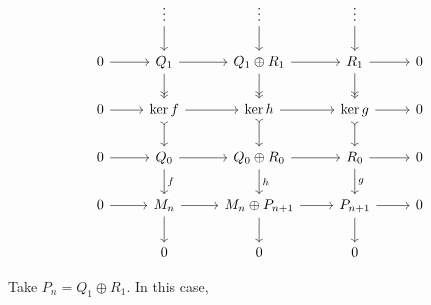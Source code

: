 \[\begin{tikzcd}
  & \vdots \ar{d} & \vdots \ar{d} & \vdots \ar{d} & \\
  0 \ar{r} & Q_1 \ar[->>]{d} \ar{r} & Q_1 \oplus R_1 \ar[->>]{d} \ar{r} & R_1 \ar[->>]{d} \ar{r} & 0 \\
  0 \ar{r} & \ker f \ar[>->]{d} \ar{r} & \ker h \ar[>->]{d} \ar{r} & \ker g \ar[>->]{d} \ar{r} & 0 \\
  0 \ar{r} & Q_0 \ar["f"]{d} \ar{r} & Q_0 \oplus R_0 \ar["h"]{d} \ar{r} & R_0 \ar["g"]{d} \ar{r} & 0 \\
  0 \ar{r} & M_n \ar{d} \ar{r} & M_n \oplus P_{n + 1} \ar{d} \ar{r} & P_{n + 1} \ar{d} \ar{r} & 0 \\
  & 0 & 0 & 0 &
\end{tikzcd}\]

Take \(P_n = Q_{1} \oplus R_{1}\).
In this case, 
